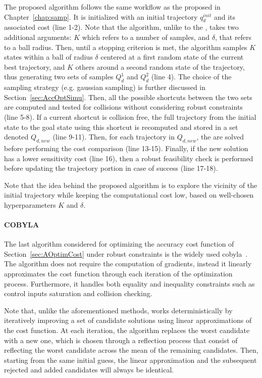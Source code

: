 The proposed algorithm follows the same workflow as the  proposed in Chapter~\ref{chap:samp}.
It is initialized with an initial trajectory $q_d^{init}$ and its associated cost (line 1-2).
Note that the algorithm, unlike to the , takes two additional arguments: $K$ which refers to a number of samples, and $\delta$, that refers to a ball radius.
Then, until a stopping criterion is met, the algorithm samples $K$ states within a ball of radius $\delta$ centered at a first random state of the current best trajectory, and $K$ others around a second random state of the trajectory, thus generating two sets of samples $Q_d^{1}$ and $Q_d^{2}$ (line 4).
The choice of the sampling strategy (e.g. gaussian sampling) is further discussed in Section~\ref{sec:AccOptSimu}.
Then, all the possible shortcuts between the two sets are computed and tested for collisions without considering robust constraints (line 5-8).
If a current shortcut is collision free, the full trajectory from the initial state to the goal state using this shortcut is recomputed and stored in a set denoted $Q_{d,new}$ (line 9-11).
Then, for each trajectory in $Q_{d,new}$, the  are solved before performing the cost comparison (line 13-15).
Finally, if the new solution has a lower sensitivity cost (line 16), then a robust feasibility check is performed before updating the trajectory portion in case of success (line 17-18).

Note that the idea behind the proposed algorithm is to explore the vicinity of the initial trajectory while keeping the computational cost low, based on well-chosen hyperparameters $K$ and $\delta$.

\paragraph{COBYLA}

The last algorithm considered for optimizing the accuracy cost function of Section~\ref{sec:AOptimCost} under robust constraints is the widely used \gls{cobyla}~\cite{cCOBYLA}.
The algorithm does not require the computation of gradients, instead it linearly approximates the cost function through each iteration of the optimization process.
Furthermore, it handles both equality and inequality constraints such as control inputs saturation and collision checking. 

Note that, unlike the aforementioned methods,  works deterministically by iteratively improving a set of candidate solutions using linear approximations of the cost function.
At each iteration, the algorithm replaces the worst candidate with a new one, which is chosen through a reflection process that consist of reflecting the worst candidate across the mean of the remaining candidates.
Then, starting from the same initial guess, the linear approximation and the subsequent rejected and added candidates will always be identical.

